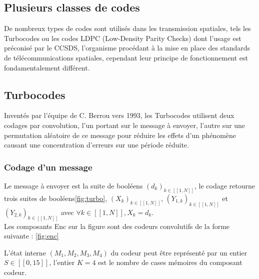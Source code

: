 \documentclass[12pt]{article}
\begin{document}
\subsection{Plusieurs classes de codes}
De nombreux types de codes sont utilis\'es dans les transmission spatiales, tels les Turbocodes ou les codes LDPC (Low-Density Parity Checks) dont l'usage est pr\'econis\'e par le CCSDS, l'organisme proc\'edant \`a la mise en place des standards de t\'el\'ecommunications spatiales, cependant leur principe de fonctionnement est fondamentalement diff\'erent.


\subsection{Turbocodes}
Invent\'es par l'\'equipe de C. Berrou vers 1993, les Turbocodes utilisent deux codages par convolution, l'un portant sur le message \`a envoyer, l'autre sur une permutation al\'eatoire de ce message pour r\'eduire les effets d'un ph\'enom\`ene causant une concentration d'erreurs sur une p\'eriode r\'eduite.


\subsubsection{Codage d'un message}

Le message \`a envoyer est la suite de bool\'eens $(d_k)_{k \in [\![1, N]\!]}$, le codage retourne trois suites de bool\'eens\ref{fig:turbo}, $(X_k)_{k \in [\![1, N]\!]}$, $(Y_{1,k})_{k \in [\![1, N]\!]}$ et $(Y_{2,k})_{k \in [\![1, N]\!]}$ avec $\forall k \in [\![1, N]\!], X_k = d_k$.\\
Les composants Enc sur la figure sont des codeurs convolutifs de la forme suivante : \ref{fig:enc}

L'\'etat interne $(M_1, M_2, M_3, M_4)$ du codeur peut \^etre repr\'esent\'e par un entier $S \in [\![0, 15]\!]$, l'entier $K = 4$ est le nombre de cases m\'emoires du composant codeur.
\end{document}
